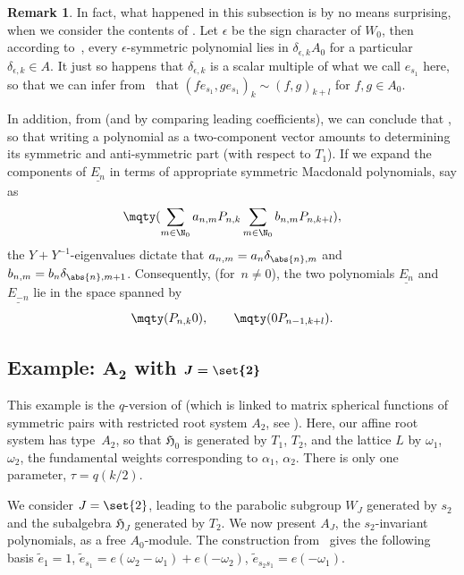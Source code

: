 \documentclass[pdftex]{sigma}
\theoremstyle{definition}
\newtheorem{Remark}[Theorem]{Remark}
\numberwithin{equation}{section}
\begin{document}
\begin{Remark}
 In fact, what happened in this subsection is by no means surprising,
 when we consider the contents of \cite[Section~5.8]{macdonald}. Let $\epsilon$
 be the sign character of $W_0$, then according to~\cite[Section~5.8.8]{macdonald}, every $\epsilon$-symmetric polynomial
 lies in $\delta_{\epsilon,k}A_0$ for a particular $\delta_{\epsilon,k}\in A$. It just so happens that $\delta_{\epsilon,k}$
 is a scalar multiple of what we call $e_{s_1}$ here, so that
 we can infer from~\cite[Section~5.8.6]{macdonald} that
$(fe_{s_1}, ge_{s_1})_k \sim (f,g)_{k+l}$
 for $f,g\in A_0$.

 In addition, from \cite[Sections~5.8.10f]{macdonald} (and by comparing leading coefficients), we can conclude that
 , so that
 writing a polynomial as a two-component vector amounts to determining
 its symmetric and anti-symmetric part (with respect to $T_1$). If we expand the components of $\underline{E_n}$ in terms of
 appropriate symmetric Macdonald polynomials, say as
 \[
 \mqty(\displaystyle \sum_{m\in\N_0} a_{n,m}P_{n,k}\vspace{1mm}\\
 \displaystyle \sum_{m\in\N_0} b_{n,m}P_{n,k+l}),
 \]
 the $Y+Y^{-1}$-eigenvalues dictate that $a_{n,m}=a_n\delta_{\abs{n},m}$
 and $b_{n,m}=b_n\delta_{\abs{n},m+1}$. Consequently, (for~${n\ne0}$), the
 two polynomials $\underline{E_n}$ and $\underline{E_{-n}}$ lie in the space spanned
 by
 \[
 \mqty(P_{n,k}\\0),\qquad \mqty(0\\P_{n-1,k+l}).
 \]
\end{Remark}

\subsection[Example: A\_2 with J=set2]{Example: $\boldsymbol{ A_2}$ with $\boldsymbol{J=\set{2}}$}
This example is the $q$-version of
\cite[Section~7]{mvpVectorValued} (which is linked to matrix spherical
functions of symmetric pairs with restricted root system $A_2$, see
\cite{shimeno}). Here, our affine root system has type~$A_2$, so that $\mathfrak{H}_0$ is generated by $T_1$, $T_2$, and the lattice
$L$ by $\omega_1$, $\omega_2$, the fundamental weights corresponding to $\alpha_1$, $\alpha_2$. There is only one parameter,
$\tau = q(k/2)$.

We consider $J=\set{2}$, leading to the parabolic subgroup $W_J$ generated
by $s_2$ and the subalgebra $\mathfrak{H}_J$ generated by $T_2$. We now
present $A_J$, the $s_2$-invariant polynomials, as a free $A_0$-module.
The construction from~\cite{pittieSteinberg} gives the following basis
$
\tilde{e}_1=1$, $ \tilde{e}_{s_1}=e(\omega_2-\omega_1) + e(-\omega_2)$, $\tilde{e}_{s_2s_1} = e(-\omega_1)$.
\end{document}
